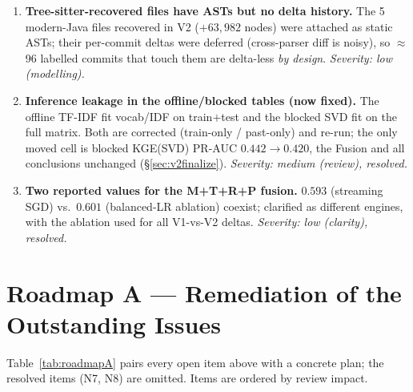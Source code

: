 \documentclass[11pt,a4paper]{article}
\begin{document}
\begin{enumerate}[nosep,label=\textbf{N\arabic*.}]
{		(review).}
		\item \textbf{Tree-sitter-recovered files have ASTs but no delta history.} The
		5 modern-Java files recovered in V2 ($+63{,}982$ nodes) were attached as static
		ASTs; their per-commit deltas were deferred (cross-parser diff is noisy), so
		$\approx$96 labelled commits that touch them are delta-less \emph{by design}.
		\emph{Severity: low (modelling).}
		\item \textbf{Inference leakage in the offline/blocked tables (now fixed).}
		The offline TF-IDF fit vocab/IDF on train$+$test and the blocked SVD fit on the
		full matrix. Both are corrected (train-only / past-only) and re-run; the only
		moved cell is blocked KGE(SVD) PR-AUC $0.442\!\rightarrow\!0.420$, the Fusion and
		all conclusions unchanged (\S\ref{sec:v2finalize}). \emph{Severity: medium
		(review), resolved.}
		\item \textbf{Two reported values for the M+T+R+P fusion.} $0.593$ (streaming
		SGD) vs.\ $0.601$ (balanced-LR ablation) coexist; clarified as different
		engines, with the ablation used for all V1-vs-V2 deltas. \emph{Severity: low
		(clarity), resolved.}
	\end{enumerate}

	\section{Roadmap A --- Remediation of the Outstanding Issues}\label{sec:roadmapA}
	Table~\ref{tab:roadmapA} pairs every open item above with a concrete plan; the
	resolved items (N7, N8) are omitted. Items are ordered by review impact.
\end{document}
